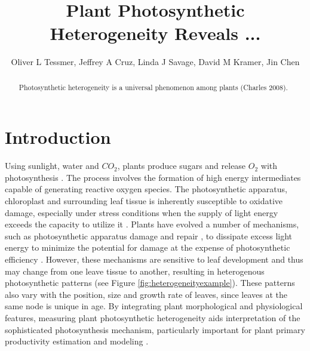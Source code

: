 \documentclass[times,11pt]{article}
\begin{document}
\title{Plant Photosynthetic Heterogeneity Reveals ...}

\author{Oliver L Tessmer, Jeffrey A Cruz, Linda J Savage, David M Kramer, Jin Chen}

\maketitle

\begin{abstract}
Photosynthetic heterogeneity is a universal phenomenon among plants (Charles 2008). 
\end{abstract}

\section{Introduction}

Using sunlight, water and $CO_2$, plants produce sugars and release $O_2$ with photosynthesis \cite{kramer2011importance}. The process involves the formation of high energy intermediates capable of generating reactive oxygen species. The photosynthetic apparatus, chloroplast and surrounding leaf tissue is inherently susceptible to oxidative damage, especially under stress conditions when the supply of light energy exceeds the capacity to utilize it \cite{asada1996radical,durrant1990characterisation}. Plants have evolved a number of mechanisms, such as photosynthetic apparatus damage and repair \cite{melis1999photosystem}, to dissipate excess light energy to minimize the potential for damage at the expense of photosynthetic efficiency \cite{adams2006energy,rochaix2014regulation}. However, these mechanisms are sensitive to leaf development and thus may change from one leave tissue to another, resulting in heterogenous photosynthetic patterns (see Figure \ref{fig:heterogeneityexample}). These patterns also vary with the position, size and growth rate of leaves, since leaves at the same node is unique in age. By integrating plant morphological and physiological features, measuring plant photosynthetic heterogeneity aids interpretation of the sophisticated photosynthesis mechanism, particularly important for plant primary productivity estimation and modeling \cite{meng2007spatial}.

\end{document}
